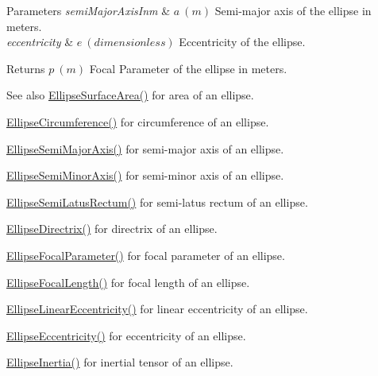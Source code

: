 \begin{DoxyParams}{Parameters}
{\em semi\+Major\+Axis\+Inm} & $ a\ (m)$ Semi-\/major axis of the ellipse in meters. \\
\hline
{\em eccentricity} & $ e\ (dimensionless)$ Eccentricity of the ellipse. \\
\hline
\end{DoxyParams}
\begin{DoxyReturn}{Returns}
$ p\ (m)$ Focal Parameter of the ellipse in meters. 
\end{DoxyReturn}
\begin{DoxySeeAlso}{See also}
\mbox{\hyperlink{group___e_g_x_math-_geometry-2_d-_ellipse-_surface_area_ga4ce8c8323e9718ce5458f4ab7f6d823d}{Ellipse\+Surface\+Area()}} for area of an ellipse. 

\mbox{\hyperlink{group___e_g_x_math-_geometry-2_d-_ellipse-_circumference_ga4172802ac674eb53467b44928ac635c7}{Ellipse\+Circumference()}} for circumference of an ellipse. 

\mbox{\hyperlink{group___e_g_x_math-_geometry-2_d-_ellipse-_semi_major_axis_ga646a2ca065f4ac3f666a9ea22f3bb527}{Ellipse\+Semi\+Major\+Axis()}} for semi-\/major axis of an ellipse. 

\mbox{\hyperlink{group___e_g_x_math-_geometry-2_d-_ellipse-_semi_minor_axis_gae461acf3333565d69527dd86e9aa2b32}{Ellipse\+Semi\+Minor\+Axis()}} for semi-\/minor axis of an ellipse. 

\mbox{\hyperlink{group___e_g_x_math-_geometry-2_d-_ellipse-_semi_latus_rectum_gacfd1844eb4ef3d1ee3c0b460a6442ae6}{Ellipse\+Semi\+Latus\+Rectum()}} for semi-\/latus rectum of an ellipse. 

\mbox{\hyperlink{group___e_g_x_math-_geometry-2_d-_ellipse-_directrix_gace8f72a8efbc9c18d3eb689151405106}{Ellipse\+Directrix()}} for directrix of an ellipse. 

\mbox{\hyperlink{group___e_g_x_math-_geometry-2_d-_ellipse-_focal_parameter_ga4cd01a38c72c092ef9791351948bf69b}{Ellipse\+Focal\+Parameter()}} for focal parameter of an ellipse. 

\mbox{\hyperlink{group___e_g_x_math-_geometry-2_d-_ellipse-_focal_length_gab8d63de7640c880cfecaeada6f2afdac}{Ellipse\+Focal\+Length()}} for focal length of an ellipse. 

\mbox{\hyperlink{group___e_g_x_math-_geometry-2_d-_ellipse-_linear_eccentricity_gac70b3010e30aa8b73deb50fe2b9b9a91}{Ellipse\+Linear\+Eccentricity()}} for linear eccentricity of an ellipse. 

\mbox{\hyperlink{group___e_g_x_math-_geometry-2_d-_ellipse-_eccentricity_ga6a0a7fba17f782616894cfc447628c33}{Ellipse\+Eccentricity()}} for eccentricity of an ellipse. 

\mbox{\hyperlink{group___e_g_x_math-_geometry-2_d-_ellipse-_inertia_ga10a3049c2f04b50f271fb01dc62e4cf8}{Ellipse\+Inertia()}} for inertial tensor of an ellipse. 
\end{DoxySeeAlso}
